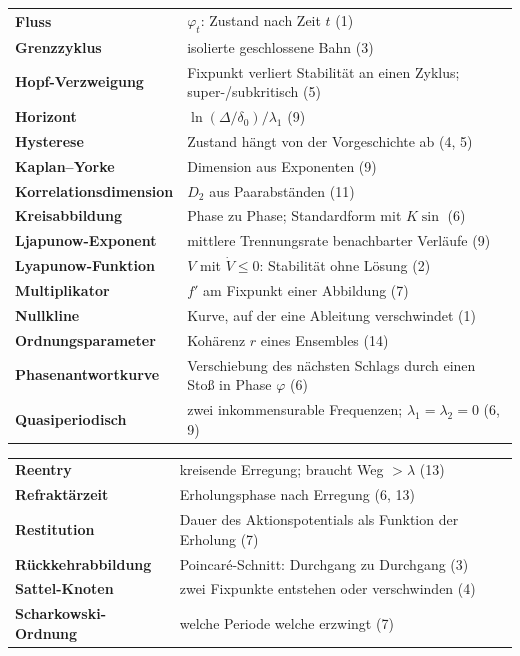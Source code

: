 \begin{merksatz}
\begin{center}
{\begin{tabular}{@{}P{3.4cm}P{5.2cm}@{}}
\textbf{Fluss} & $\varphi_t$: Zustand nach Zeit $t$ (1)\\
\textbf{Grenzzyklus} & isolierte geschlossene Bahn (3)\\
\textbf{Hopf-Verzweigung} & Fixpunkt verliert Stabilität an einen Zyklus; super-/subkritisch (5)\\
\textbf{Horizont} & $\ln(\Delta/\delta_0)/\lambda_1$ (9)\\
\textbf{Hysterese} & Zustand hängt von der Vorgeschichte ab (4, 5)\\
\textbf{Kaplan--Yorke} & Dimension aus Exponenten (9)\\
\textbf{Korrelations\-dimension} & $D_2$ aus Paarabständen (11)\\
\textbf{Kreisabbildung} & Phase zu Phase; Standardform mit $K\sin$ (6)\\
\textbf{Ljapunow-Exponent} & mittlere Trennungsrate benachbarter Verläufe (9)\\
\textbf{Lyapunow-Funktion} & $V$ mit $\dot V \le 0$: Stabilität ohne Lösung (2)\\
\textbf{Multiplikator} & $f'$ am Fixpunkt einer Abbildung (7)\\
\textbf{Nullkline} & Kurve, auf der eine Ableitung verschwindet (1)\\
\textbf{Ordnungsparameter} & Kohärenz $r$ eines Ensembles (14)\\
\textbf{Phasenantwort\-kurve} & Verschiebung des nächsten Schlags durch einen Stoß in Phase $\varphi$ (6)\\
\textbf{Quasiperiodisch} & zwei inkommensurable Frequenzen; $\lambda_1 = \lambda_2 = 0$ (6, 9)\\
\bottomrule
\end{tabular}}
\end{center}
\begin{center}
{\small
\renewcommand{\arraystretch}{1.42}
\begin{tabular}{@{}P{3.4cm}P{5.2cm}@{}}
\toprule
\textbf{Reentry} & kreisende Erregung; braucht Weg $> \lambda$ (13)\\
\textbf{Refraktärzeit} & Erholungsphase nach Erregung (6, 13)\\
\textbf{Restitution} & Dauer des Aktionspotentials als Funktion der Erholung (7)\\
\textbf{Rückkehrabbildung} & Poincaré-Schnitt: Durchgang zu Durchgang (3)\\
\textbf{Sattel-Knoten} & zwei Fixpunkte entstehen oder verschwinden (4)\\
\textbf{Scharkowski-Ordnung} & welche Periode welche erzwingt (7)\\

\end{tabular}}
\end{center}
\end{merksatz}
